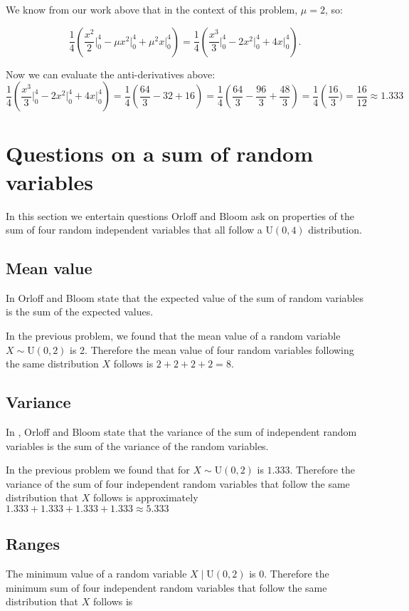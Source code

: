 \documentclass[a4paper,11pt]{article}
\begin{document}
We know from our work above that in the context of this problem, $\mu=2$, so:


\begin{equation}
  \frac{1}{4} \left( \frac{x^2}{2} \bigg\rvert_0^4 - \mu x^2 \bigg\rvert_0^4
    + \mu^2 x \bigg\rvert_0^4 \right) =
    \frac{1}{4} \left( \frac{x^3}{3} \bigg\rvert_0^4 - 2 x^2 \bigg\rvert_0^4
    + 4 x \bigg\rvert_0^4 \right).
\end{equation}

Now we can evaluate the anti-derivatives above:
\begin{equation}
    \frac{1}{4} \left( \frac{x^3}{3} \bigg\rvert_0^4 - 2 x^2 \bigg\rvert_0^4
    + 4 x \bigg\rvert_0^4 \right) =
    \frac{1}{4} \left( \frac{64}{3} - 32 + 16 \right)
    = \frac{1}{4} \left( \frac{64}{3} - \frac{96}{3} + \frac{48}{3} \right)
    = \frac{1}{4} \left(\frac{16}{3})
    =\frac{16}{12} \approx 1.333
\end{equation}

\section{Questions on a sum of random variables}
In this section we entertain questions Orloff and Bloom ask on properties of the
sum of four random independent variables that all follow a U$\left(0,4 \right)$
distribution.

\subsection{Mean value}
In \cite{reading6a} Orloff and Bloom state that the expected value
of the sum of random variables is the sum of the expected values.

In the previous problem, we found that the mean value of a random variable
$X \sim \text{U}\left( 0,2 \right)$ is 2.  Therefore the mean value of
four random variables following the same distribution $X$ follows is
$2+2+2+2=8$.

\subsection{Variance}

In \cite{reading6a}, Orloff and Bloom state that the variance of the sum of
independent random variables is the sum of the variance of the random variables.

In the previous problem we found that for $X \sim \text{U}\left( 0,2 \right)$
is $1.333$.  Therefore the variance of the sum of four independent random
variables that follow the same distribution that $X$ follows is approximately
$1.333 + 1.333 + 1.333 + 1.333 \approx 5.333$

\subsection{Ranges}

The minimum value of a random variable $X \mid \text{U}\left( 0, 2 \right)$ is
0.  Therefore the minimum sum of four independent random variables that follow the same
distribution that $X$ follows is
\printbibliography{}
\end{document}

